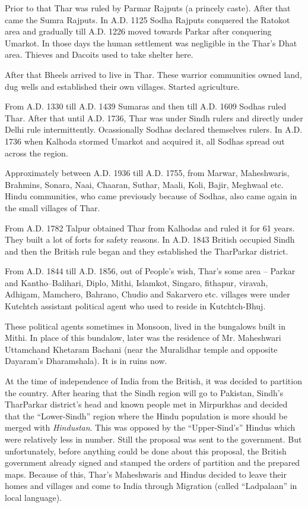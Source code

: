 Prior to that Thar was ruled by Parmar Rajputs (a princely caste). After that came the Sumra Rajputs. In A.D. 1125 Sodha Rajputs conquered the Ratokot area and gradually till A.D. 1226 moved towards Parkar after conquering Umarkot. In those days the human settlement was negligible in the Thar's Dhat area. Thieves and Dacoits used to take shelter here.

After that Bheels arrived to live in Thar. These warrior communities owned land, dug wells and established their own villages. Started agriculture.

From A.D. 1330 till A.D. 1439 Sumaras and then till A.D. 1609 Sodhas ruled Thar. After that until A.D. 1736, Thar was under Sindh rulers and directly under Delhi rule intermittently. Ocassionally Sodhas declared themselves rulers. In A.D. 1736 when Kalhoda stormed Umarkot and acquired it, all Sodhas spread out across the region.

Approximately between A.D. 1936 till A.D. 1755, from Marwar, Maheshwaris, Brahmins, Sonara, Naai, Chaaran, Suthar, Maali, Koli, Bajir, Meghwaal etc. Hindu communities, who came previously because of Sodhas, also came again in the small villages of Thar.

From A.D. 1782 Talpur obtained Thar from Kalhodas and ruled it for 61 years. They built a lot of forts for safety reasons. In A.D. 1843 British occupied Sindh and then the British rule began and they established the TharParkar district.

From A.D. 1844 till A.D. 1856, out of People's wish, Thar's some area -- Parkar and Kantho--Balihari, Diplo, Mithi, Islamkot, Singaro, fithapur, viravah, Adhigam, Mamchero, Bahrano, Chudio and Sakarvero etc. villages were under Kutchtch assistant political agent who used to reside in Kutchtch-Bhuj.

These political agents sometimes in Monsoon, lived in the bungalows built in Mithi. In place of this bundalow, later was the residence of Mr. Maheshwari Uttamchand Khetaram Bachani (near the Muralidhar temple and opposite Dayaram's Dharamshala). It is in ruins now.

At the time of independence of India from the British, it was decided to partition the country. After hearing that the Sindh region will go to Pakistan, Sindh's TharParkar district's head and known people met in  Mirpurkhas and decided that the ``Lower-Sindh'' region where the Hindu population is more should be merged with \textit{Hindustan}. This was opposed by the ``Upper-Sind's'' Hindus which were relatively less in number. Still the proposal was sent to the government. But unfortunately, before anything could be done about this proposal, the British government already signed and stamped the orders of partition and the prepared maps. Because of this, Thar's Maheshwaris and Hindus decided to leave their homes and villages and come to India through Migration (called ``Ladpalaan'' in local language).


